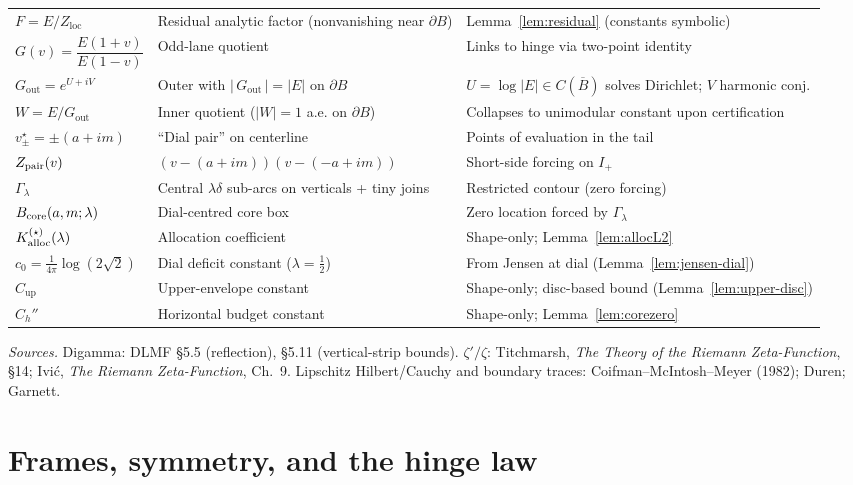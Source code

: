 \documentclass[11pt]{article}
\numberwithin{equation}{section}
\theoremstyle{remark}
\newcommand{\Gout}{G_{\mathrm{out}}}
\newcommand{\Zloc}{Z_{\mathrm{loc}}}
\begin{document}
\begin{tabularx}{\textwidth}{@{}p{3.2cm} L L@{}}
$F=E/\Zloc$ & Residual analytic factor (nonvanishing near $\partial B$) & Lemma~\ref{lem:residual} (constants symbolic)\\[2pt]
$G(v)=\dfrac{E(1+v)}{E(1-v)}$ & Odd-lane quotient & Links to hinge via two-point identity\\[2pt]
$\Gout=e^{U+iV}$ & Outer with $|\,\Gout\,|=|E|$ on $\partial B$ & $U=\log|E|\in C(\overline B)$ solves Dirichlet; $V$ harmonic conj.\\[2pt]
$W=E/\Gout$ & Inner quotient ($|W|=1$ a.e. on $\partial B$) & Collapses to unimodular constant upon certification\\[2pt]
$v_\pm^\star=\pm(a+im)$ & “Dial pair” on centerline & Points of evaluation in the tail\\[2pt]
$Z_{\rm pair}(v)$ & $(v-(a+im))(v-(-a+im))$ & Short-side forcing on $I_+$\\[2pt]
$\Gamma_\lambda$ & Central $\lambda\delta$ sub-arcs on verticals + tiny joins & Restricted contour (zero forcing)\\[2pt]
$B_{\rm core}(a,m;\lambda)$ & Dial-centred core box & Zero location forced by $\Gamma_\lambda$\\[2pt]
$K_{\rm alloc}^{(\star)}(\lambda)$ & Allocation coefficient & Shape-only; Lemma~\ref{lem:allocL2}\\[2pt]
$c_0=\frac{1}{4\pi}\log(2\sqrt{2})$ & Dial deficit constant ($\lambda=\tfrac12$) & From Jensen at dial (Lemma~\ref{lem:jensen-dial})\\[2pt]
$C_{\mathrm{up}}$ & Upper-envelope constant & Shape-only; disc-based bound (Lemma~\ref{lem:upper-disc})\\[2pt]
$C_h''$ & Horizontal budget constant & Shape-only; Lemma~\ref{lem:corezero}\\
\bottomrule
\end{tabularx}

\medskip
\noindent\textit{Sources.} Digamma: DLMF §5.5 (reflection), §5.11 (vertical-strip bounds). $\zeta'/\zeta$: Titchmarsh, \textit{The Theory of the Riemann Zeta-Function}, §14; Ivi\'c, \textit{The Riemann Zeta-Function}, Ch.~9. Lipschitz Hilbert/Cauchy and boundary traces: Coifman--McIntosh--Meyer (1982); Duren; Garnett.

\section{Frames, symmetry, and the hinge law}\label{sec:frames}
\end{document}
